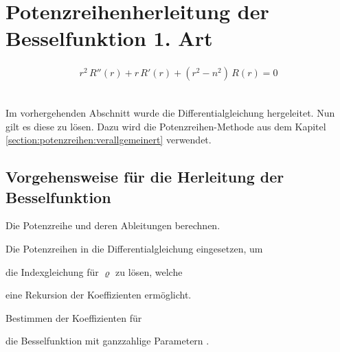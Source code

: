 %
%
%
%
%
\section[Potenzreihenherleitung der Besselfunktion]{Potenzreihenherleitung der Besselfunktion 1. Art}
\begin{normalsize}
\end{normalsize}
\begin{align}
	r^2 \, R'' \left( r \right)
	+
	r \, R' \left( r \right)
	+
	\left( r^2 - n^2 \right) \, R \left( r \right)
	=
	0
	\label{eq:bessel:dgl}
\end{align}
\\
\begin{normalsize}
	Im vorhergehenden Abschnitt wurde die Differentialgleichung  hergeleitet.
	Nun gilt es diese zu l\"osen.
	Dazu wird die Potenzreihen-Methode aus dem Kapitel \ref{section:potenzreihen:verallgemeinert} verwendet.
\end{normalsize}
\subsection[Vorgehensweise]{Vorgehensweise f\"ur die Herleitung der Besselfunktion}
\begin{compactenum}
	\item Die Potenzreihe und deren Ableitungen berechnen.
	\item Die Potenzreihen in die Differentialgleichung  eingesetzen, um
	\item die Indexgleichung f\"ur $\varrho$ zu l\"osen, welche
	\item eine Rekursion der Koeffizienten erm\"oglicht.
	\item Bestimmen der Koeffizienten f\"ur
	\item die Besselfunktion mit ganzzahlige Parametern .
\end{compactenum}


